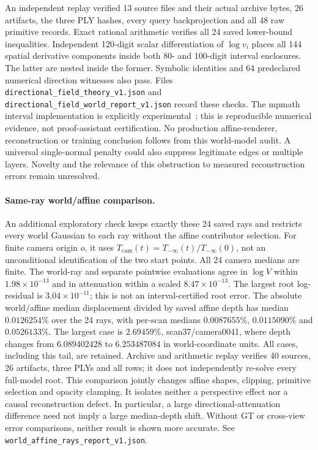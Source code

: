 \documentclass[11pt,a4paper]{article}
\begin{document}
An independent replay verified 13 source files and their actual archive
bytes, 26 artifacts, the three PLY hashes, every query backprojection
and all 48 raw primitive records. Exact rational arithmetic verifies
all 24 saved lower-bound inequalities. Independent 120-digit scalar
differentiation of $\log v_i$ places all 144 spatial derivative
components inside both 80- and 100-digit interval enclosures.
The latter are nested inside the former. Symbolic identities and
64 predeclared numerical direction witnesses also pass.
Files \texttt{directional\_field\_theory\_v1.json} and
\texttt{directional\_field\_world\_report\_v1.json} record these checks.
The mpmath interval implementation is explicitly experimental~\cite{mpmathiv};
this is reproducible numerical evidence, not proof-assistant certification.
No production affine-renderer, reconstruction or training conclusion
follows from this world-model audit. A universal single-normal penalty
could also suppress legitimate edges or multiple layers. Novelty and
the relevance of this obstruction to measured reconstruction errors
remain unresolved.

\paragraph{Same-ray world/affine comparison.}
An additional exploratory check keeps exactly these 24 saved rays and
restricts every world Gaussian to each ray without the affine
contributor selection. For finite camera origin $o$, it uses
$T_{\mathrm{cam}}(t)=T_{-\infty}(t)/T_{-\infty}(0)$, not an
unconditional identification of the two start points. All 24 camera
medians are finite. The world-ray and separate pointwise evaluations
agree in $\log V$ within $1.98\times10^{-13}$ and in attenuation
within a scaled $8.47\times10^{-13}$. The largest root log-residual
is $3.04\times10^{-11}$; this is not an interval-certified root error.
The absolute world/affine median displacement divided by saved affine
depth has median $0.0126254\%$ over the 24 rays, with per-scan medians
$0.0087655\%$, $0.0115090\%$ and $0.0526133\%$.
The largest case is $2.69459\%$, scan37/camera0041, where depth
changes from $6.089402428$ to $6.253487084$ in world-coordinate units.
All cases, including this tail, are retained. Archive and arithmetic
replay verifies 40 sources, 26 artifacts, three PLYs and all rows;
it does not independently re-solve every full-model root.
This comparison jointly changes affine shapes, clipping, primitive
selection and opacity clamping. It isolates neither a perspective
effect nor a causal reconstruction defect. In particular, a large
directional-attenuation difference need not imply a large median-depth
shift. Without GT or cross-view error comparisons, neither result is
shown more accurate. See \texttt{world\_affine\_rays\_report\_v1.json}.
\end{document}

